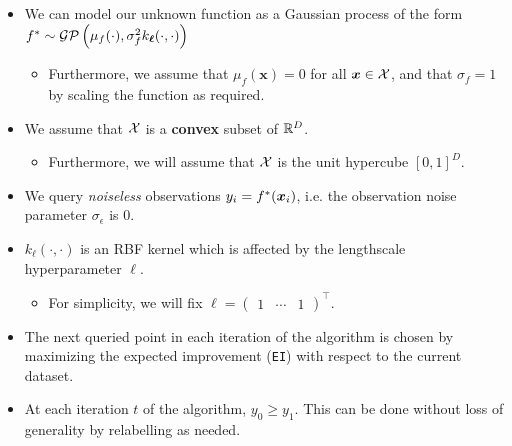 \documentclass[11pt]{article}
\numberwithin{figure}{section}
\numberwithin{equation}{section}
\def\EI{\texttt{EI}}
\def\calGP{\mathcal{GP}}
\newcommand{\bs}[1]{\boldsymbol{#1}}
\def\bsx{\bs{x}}
\def\bell{\bs{\ell}}
\begin{document}
\begin{itemize}[label=]

  \item We can model our unknown function as a Gaussian process of the form $\fstar \sim \calGP\left(\mu_{f}(\cdot), \sigma_{f}^{2}k_{\bell}(\cdot, \cdot)\right)$
  \begin{itemize}[label=]
    \item Furthermore, we assume that $\mu_{f}(\bsx) = 0$ for all $\bsx \in \calX$, and that $\sigma_{f} = 1$ by scaling the function as required.
  \end{itemize}

  \item We assume that $\mathcal{X}$ is a \textbf{convex} subset of $\mathbb{R}^{D}$. 
  \begin{itemize}[label=]
    \item Furthermore, we will assume that $\mathcal{X}$ is the unit hypercube $[0, 1]^{D}$.
  \end{itemize}

  \item We query \textit{noiseless} observations $y_{i} = \fstar(\bsx_{i})$, i.e. the observation noise parameter $\sigma_{\epsilon}$ is 0. 

  \item $k_{\bell}(\cdot, \cdot)$ is an RBF kernel which is affected by the lengthscale hyperparameter $\bell$.
  \begin{itemize}[label=]
    \item For simplicity, we will fix $\bell = \begin{pmatrix}1 & \cdots & 1 \end{pmatrix}^{\top}$.
  \end{itemize}

  \item The next queried point in each iteration of the algorithm is chosen by maximizing the expected improvement (\EI{}) with respect to the current dataset. 

  \item At each iteration $t$ of the algorithm, $y_{0} \ge y_{1}$. This can be done without loss of generality by relabelling as needed.
\end{itemize}
\end{document}
